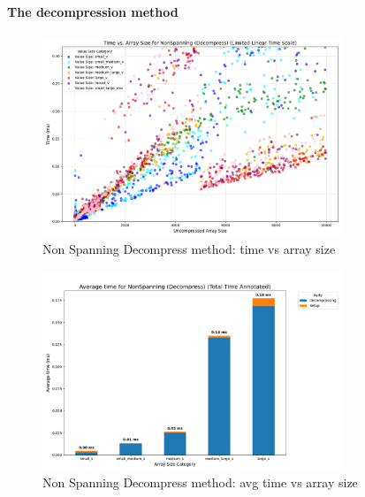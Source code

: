 \documentclass[11pt, a4paper]{article}
\begin{document}
	\paragraph{The decompression method}
	\begin{figure}[H]%
		\centering
		\includegraphics[width=0.8\textwidth]{Grafics/NonSpanning/NonSpanningDecompressTimevsSize.png}
		\caption{Non Spanning Decompress method: time vs array size}
		\label{fig:7}
		
	\end{figure}
	\begin{figure}[H]%
		\centering
		\includegraphics[width=0.8\textwidth]{Grafics/NonSpanning/NonSpanningDecompressTime.png}
		\caption{Non Spanning Decompress method: avg time vs array size}
		\label{fig:8}
	\end{figure}
	
\end{document}
